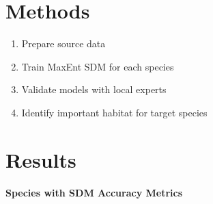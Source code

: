 \documentclass[a0paper,fleqn]{betterposter}
\begin{document}
{\section{Methods}
\vspace{-15mm}
\begin{enumerate}
    \item Prepare source data
    \item Train MaxEnt SDM for each species
    \item Validate models with local experts
    \item Identify important habitat for target species
\end{enumerate}




}{
\section{Results}

\textbf{Species with SDM Accuracy Metrics}
\begingroup %
\huge

}
\end{document}
